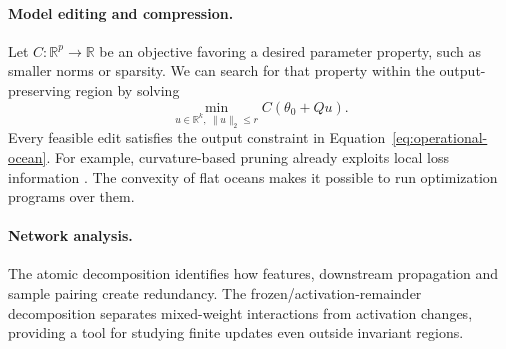 \paragraph{Model editing and compression.}
Let $C:\mathbb R^p\to\mathbb R$ be an objective favoring a desired parameter property, such as smaller norms or sparsity. We can search for that property within the output-preserving region by solving
\begin{equation}
\min_{u\in\mathbb R^k,\ \|u\|_2\le r} C(\theta_0+Qu).
\label{eq:ocean-secondary-objective}
\end{equation}
Every feasible edit satisfies the output constraint in Equation~\ref{eq:operational-ocean}. For example, curvature-based pruning already exploits local loss information \citep{lecun1989brain}. The convexity of flat oceans makes it possible to run optimization programs over them.

\paragraph{Network analysis.}
The atomic decomposition identifies how features, downstream propagation and sample pairing create redundancy. The frozen/activation-remainder decomposition separates mixed-weight interactions from activation changes, providing a tool for studying finite updates even outside invariant regions.

